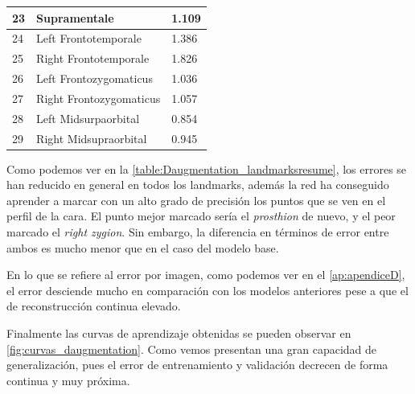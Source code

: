 \begin{table}[!ht]
\begin{tabular}{|l|l|l|}
                    23 & Supramentale & 1.109 \\ \hline
                    24 & Left Frontotemporale & 1.386 \\ \hline
                    25 & Right Frontotemporale & 1.826 \\ \hline
                    26 & Left Frontozygomaticus & 1.036 \\ \hline
                    27 & Right Frontozygomaticus & 1.057 \\ \hline
                    28 & Left Midsurpaorbital & 0.854 \\ \hline
                    29 & Right Midsupraorbital & 0.945 \\ \hline
                \end{tabular}
                \label{table:Daugmentation_landmarksresume}
            \end{table}

            \medskip

            \noindent Como podemos ver en la \autoref{table:Daugmentation_landmarksresume}, los errores se han reducido en general en todos los landmarks, además la red ha conseguido aprender a marcar con un alto grado de precisión los puntos que se ven en el perfil de la cara. El punto mejor marcado sería el \textit{prosthion} de nuevo, y el peor marcado el \textit{right zygion}. Sin embargo, la diferencia en términos de error entre ambos es mucho menor que en el caso del modelo base. 

            \medskip

            \noindent En lo que se refiere al error por imagen, como podemos ver en el \autoref{ap:apendiceD}, el error desciende mucho en comparación con los modelos anteriores pese a que el de reconstrucción continua elevado.

            \medskip

            \noindent Finalmente las curvas de aprendizaje obtenidas se pueden observar en \autoref{fig:curvas_daugmentation}. Como vemos presentan una gran capacidad de generalización, pues el error de entrenamiento y validación decrecen de forma continua y muy próxima.

